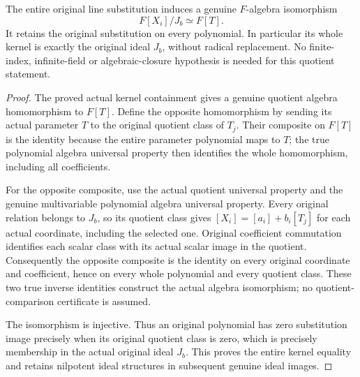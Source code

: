 \begin{theorem}
\label{algebra:line-quotient-whole-polynomial}
\leanok
{}
The entire original line substitution induces a genuine $F$-algebra
isomorphism
\[
 F[X_i]/J_b\simeq F[T].
\]
It retains the original substitution on every polynomial. In particular
its whole kernel is exactly the original ideal $J_b$, without radical
replacement. No finite-index, infinite-field or algebraic-closure
hypothesis is needed for this quotient statement.
\end{theorem}
\begin{proof}
The proved actual kernel containment gives a genuine quotient algebra
homomorphism to $F[T]$. Define the opposite homomorphism by sending
its actual parameter $T$ to the original quotient class of $T_j$.
Their composite on $F[T]$ is the identity because the entire parameter
polynomial maps to $T$; the true polynomial algebra universal property
then identifies the whole homomorphism, including all coefficients.

For the opposite composite, use the actual quotient universal property
and the genuine multivariable polynomial algebra universal property.
Every original relation belongs to $J_b$, so its quotient class gives
$[X_i]=[a_i]+b_i[T_j]$ for each actual coordinate, including the selected
one. Original coefficient commutation identifies each scalar class
with its actual scalar image in the quotient. Consequently the
opposite composite is the identity on every original coordinate and
coefficient, hence on every whole polynomial and every quotient class.
These two true inverse identities construct the actual algebra
isomorphism; no quotient-comparison certificate is assumed.

The isomorphism is injective. Thus an original polynomial has zero
substitution image precisely when its original quotient class is zero,
which is precisely membership in the actual original ideal $J_b$.
This proves the entire kernel equality and retains nilpotent ideal
structures in subsequent genuine ideal images.
\end{proof}


